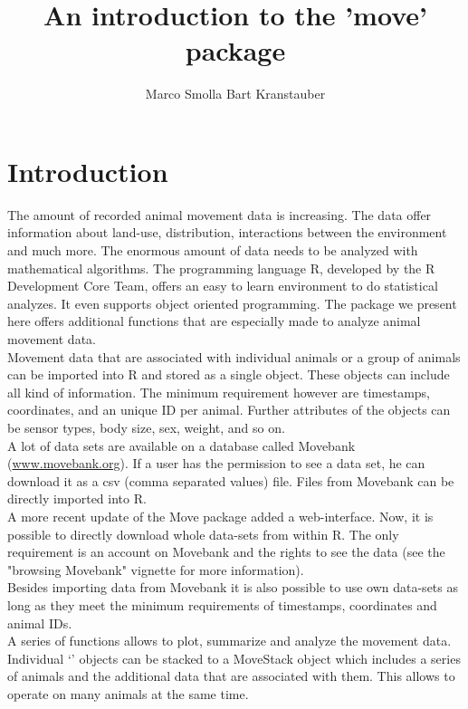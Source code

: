 \documentclass[article,nojss]{jss}
\author{Marco Smolla \And Bart Kranstauber}
\title{An introduction to the 'move' package}
\newcommand{\class}[1]{{`\code{#1}'}}
\begin{document}





\section*{Introduction}
The amount of recorded animal movement data is increasing. The data offer information about land-use, distribution, interactions between the environment and much more. The enormous amount of data needs to be analyzed with mathematical algorithms. The programming language R, developed by the R Development Core Team, offers an easy to learn environment to do statistical analyzes. It even supports object oriented programming. The package we present here offers additional functions that are especially made to analyze animal movement data. \\
Movement data that are associated with individual animals or a group of animals can be imported into R and stored as a single object. These objects can include all kind of information. The minimum requirement however are timestamps, coordinates, and an unique ID per animal. Further attributes of the objects can be sensor types, body size, sex, weight, and so on. \\
A lot of data sets are available on a database called Movebank (\url{www.movebank.org}). If a user has the permission to see a data set, he can download it as a csv (comma separated values) file. Files from Movebank can be directly imported into R. \\
A more recent update of the Move package added a web-interface. Now, it is possible to directly download whole data-sets from within R. The only requirement is an account on Movebank and the rights to see the data (see the "browsing Movebank" vignette for more information). \\
Besides importing data from Movebank it is also possible to use own data-sets as long as they meet the minimum requirements of timestamps, coordinates and animal IDs. \\
A series of functions allows to plot, summarize and analyze the movement data. Individual \class{Move} objects can be stacked to a MoveStack object which includes a series of animals and the additional data that are associated with them. This allows to operate on many animals at the same time. \\
\end{document}
